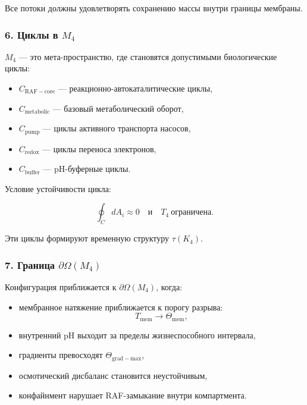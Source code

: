 Все потоки должны удовлетворять сохранению массы внутри границы мембраны.

\subsubsection*{6. Циклы в \texorpdfstring{$M_4$}{M_4}}

$M_4$ — это мета-пространство, где становятся допустимыми биологические циклы:

\begin{itemize}
    \item $C_{\mathrm{RAF-core}}$ — реакционно-автокаталитические циклы,
    \item $C_{\mathrm{metabolic}}$ — базовый метаболический оборот,
    \item $C_{\mathrm{pump}}$ — циклы активного транспорта насосов,
    \item $C_{\mathrm{redox}}$ — циклы переноса электронов,
    \item $C_{\mathrm{buffer}}$ — pH-буферные циклы.
\end{itemize}

Условие устойчивости цикла:

\[
\oint_C dA_i \approx 0
\quad\text{и}\quad
T_4 \ \text{ограничена}.
\]

Эти циклы формируют временную структуру $\tau(K_4)$.

\subsubsection*{7. Граница \texorpdfstring{$\partial\Omega(M_4)$}{\partial\Omega(M_4)}}

Конфигурация приближается к $\partial\Omega(M_4)$, когда:

\begin{itemize}
    \item мембранное натяжение приближается к порогу разрыва:
    \[
    T_{\mathrm{mem}} \to \Theta_{\mathrm{mem}},
    \]
    \item внутренний pH выходит за пределы жизнеспособного интервала,
    \item градиенты превосходят $\Theta_{\mathrm{grad-max}}$,
    \item осмотический дисбаланс становится неустойчивым,
    \item конфайнмент нарушает RAF-замыкание внутри компартмента.
\end{itemize}


